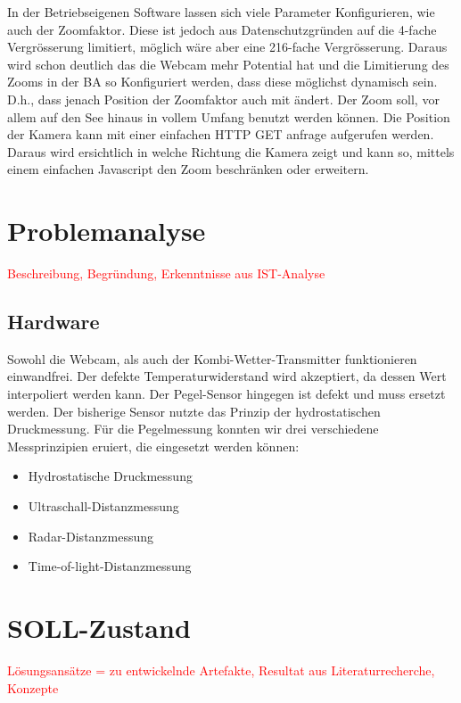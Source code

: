 \documentclass[a4paper,ngerman, 11pt, pagesize]{report}
\newcommand\Diskussionspunkt[1]{\textcolor{red}{#1}}
\begin{document}
In der Betriebseigenen Software lassen sich viele Parameter Konfigurieren, wie auch der Zoomfaktor. Diese ist jedoch aus Datenschutzgründen auf die 4-fache Vergrösserung limitiert, möglich wäre aber eine 216-fache Vergrösserung. Daraus wird schon deutlich das die Webcam mehr Potential hat und die Limitierung des Zooms in der BA so Konfiguriert werden, dass diese möglichst dynamisch sein. D.h., dass jenach Position der Zoomfaktor auch mit ändert. Der Zoom soll, vor allem auf den See hinaus in vollem Umfang benutzt werden können. Die Position der Kamera kann mit einer einfachen HTTP GET anfrage aufgerufen werden. Daraus wird ersichtlich in welche Richtung die Kamera zeigt und kann so, mittels einem einfachen Javascript den Zoom beschränken oder erweitern.

\section{Problemanalyse}
\Diskussionspunkt{Beschreibung, 
Begründung, 
Erkenntnisse aus IST-Analyse}

\subsection{Hardware}
Sowohl die Webcam, als auch der Kombi-Wetter-Transmitter funktionieren einwandfrei. Der defekte Temperaturwiderstand wird akzeptiert, da dessen Wert interpoliert werden kann. Der Pegel-Sensor hingegen ist defekt und muss ersetzt werden. Der bisherige Sensor nutzte das Prinzip der hydrostatischen Druckmessung. Für die Pegelmessung konnten wir drei verschiedene Messprinzipien eruiert, die eingesetzt werden können:

\begin{itemize}  
\item Hydrostatische Druckmessung
\item Ultraschall-Distanzmessung
\item Radar-Distanzmessung
\item Time-of-light-Distanzmessung
\end{itemize}




\section{SOLL-Zustand}
\Diskussionspunkt{Lösungsansätze = zu entwickelnde Artefakte, 
Resultat aus Literaturrecherche, 
Konzepte}
\end{document}
